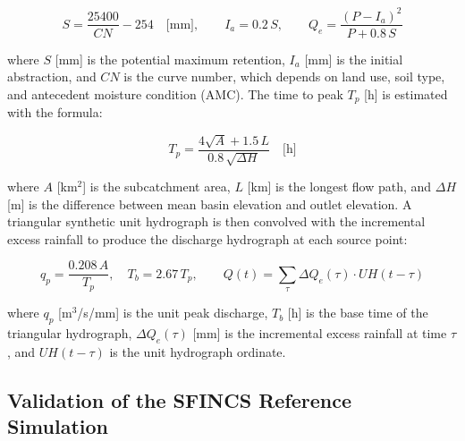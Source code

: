 \documentclass[12pt,a4paper]{report}
\begin{document}
\begin{equation}
    S = \frac{25400}{CN} - 254 \quad \text{[mm]}, \qquad
    I_a = 0.2\,S, \qquad
    Q_e = \frac{(P - I_a)^2}{P + 0.8\,S}
    \label{eq:scscn}
\end{equation}

where $S$ [mm] is the potential maximum retention, $I_a$ [mm] is the initial
abstraction, and $CN$ is the curve number, which depends on land use, soil type, and
antecedent moisture condition (AMC). The time to peak $T_p$ [h] is estimated with the
\citet{giandotti1934previsione} formula:

\begin{equation}
    T_p = \frac{4\sqrt{A} + 1.5\,L}{0.8\,\sqrt{\Delta H}} \quad \text{[h]}
    \label{eq:giandotti}
\end{equation}

where $A$ [km$^2$] is the subcatchment area, $L$ [km] is the longest flow path, and
$\Delta H$ [m] is the difference between mean basin elevation and outlet elevation. A
triangular synthetic unit hydrograph \citep{usdanrcs2007,chow1988applied} is then
convolved with the incremental excess rainfall to produce the discharge hydrograph at
each source point:

\begin{equation}
    q_p = \frac{0.208\,A}{T_p}, \quad T_b = 2.67\,T_p, \qquad
    Q(t) = \sum_\tau \Delta Q_e(\tau) \cdot UH(t-\tau)
    \label{eq:uh}
\end{equation}

where $q_p$ [m$^3$/s/mm] is the unit peak discharge, $T_b$ [h] is the base time of the
triangular hydrograph, $\Delta Q_e(\tau)$ [mm] is the incremental excess rainfall at
time $\tau$, and $UH(t-\tau)$ is the unit hydrograph ordinate.
 
 
 
\subsection{Validation of the SFINCS Reference Simulation}
\label{subsec:sfincs_validation}
 
\end{document}
